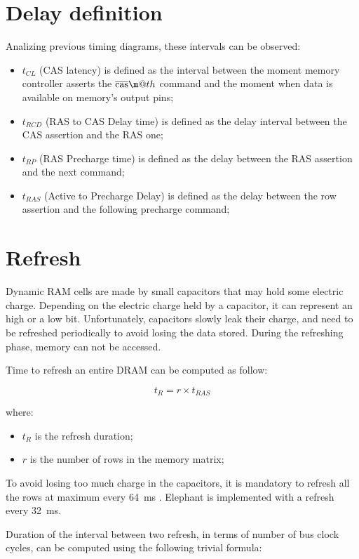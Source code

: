 \documentclass[a4paper,12pt]{article}
\makeatletter
\newcommand*{\textoverline}[1]{$\overline{\hbox{#1}}\m@th$}
\newcommand{\memoryname}{Elephant}
\makeatother
\begin{document}
\section{Delay definition}
Analizing previous timing diagrams, these intervals can be observed:
\begin{itemize}
  \item $t_{CL}$ (CAS latency) is defined as the interval between the moment memory controller asserts the \emph{\textoverline{cas}} command and the moment when data is available on memory's output pins;
  \item $t_{RCD}$ (RAS to CAS Delay time) is defined as the delay interval between the CAS assertion and the RAS one;
  \item $t_{RP}$ (RAS Precharge time) is defined as the delay between the RAS assertion and the next command;
  \item $t_{RAS}$ (Active to Precharge Delay) is defined as the delay between the row assertion and the following precharge command;
\end{itemize}

\section{Refresh}
Dynamic RAM cells are made by small capacitors that may hold some electric charge.
Depending on the electric charge held by a capacitor, it can represent an high or a low bit.
Unfortunately, capacitors slowly leak their charge, and need to be refreshed periodically to avoid losing the data stored.
During the refreshing phase, memory can not be accessed.

Time to refresh an entire DRAM can be computed as follow:

$$ t_{R} = r \times t_{RAS} $$

where:

\begin{itemize}
  \item $t_{R}$ is the refresh duration;
  \item $r$ is the number of rows in the memory matrix;
\end{itemize}

To avoid losing too much charge in the capacitors, it is mandatory to refresh all the rows at maximum every 64~ms \cite{bib:jedec}.
\memoryname{} is implemented with a refresh every 32~ms.

Duration of the interval between two refresh, in terms of number of bus clock cycles, can be computed using the following trivial formula:
\end{document}
